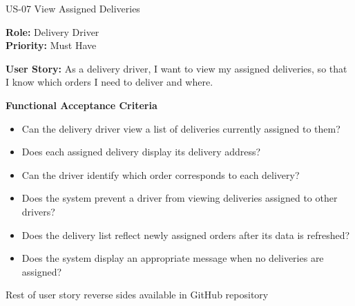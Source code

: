 
\begin{frame}{US-07 View Assigned Deliveries}

\noindent\textbf{Role:} Delivery Driver\\
\textbf{Priority:} Must Have

\textbf{User Story:} As a delivery driver, I want to view my assigned deliveries, so that I know which orders I need to deliver and where.

\textbf{Functional Acceptance Criteria}
\begin{itemize}
  \item Can the delivery driver view a list of deliveries currently assigned to them?
  \item Does each assigned delivery display its delivery address?
  \item Can the driver identify which order corresponds to each delivery?
  \item Does the system prevent a driver from viewing deliveries assigned to other drivers?
  \item Does the delivery list reflect newly assigned orders after its data is refreshed?
  \item Does the system display an appropriate message when no deliveries are assigned?
\end{itemize}
Rest of user story reverse sides available in GitHub repository

\end{frame}

